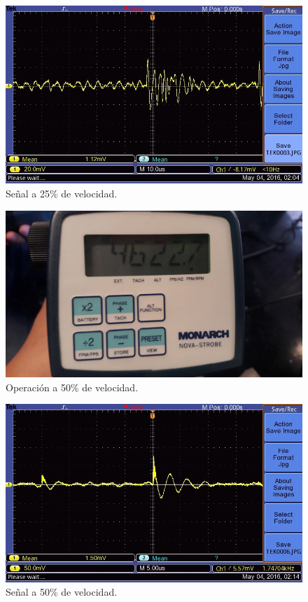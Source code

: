   \begin{figure}[!htbp]
 \centering
 \includegraphics [scale=0.25]
 {./img/tek0003.jpg}
  \caption{Se\~nal a 25\% de velocidad.}
 \end{figure}

  \begin{figure}[!htbp]
 \centering
 \includegraphics [scale=0.2]
 {./img/4622.jpg}
  \caption{Operaci\'on a 50\% de velocidad.}
 \end{figure}

  \begin{figure}[!htbp]
 \centering
 \includegraphics [scale=0.25]
 {./img/tek0006.jpg}
  \caption{Se\~nal a 50\% de velocidad.}
 \end{figure}

